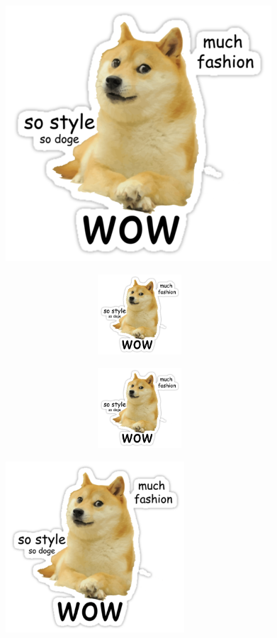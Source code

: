 \documentclass[12pt, a4paper]{article}
\begin{document}

\includegraphics[scale=0.5]{doge.png} 

\includegraphics[height=3cm,width=10cm]{doge.png}

\includegraphics[height=3cm,width=10cm,keepaspectratio]{doge.png}

\includegraphics[width=0.5\textwidth]{doge.png}
\end{document}

